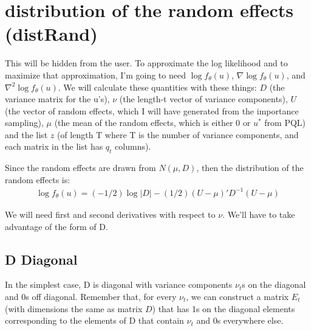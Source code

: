 \documentclass{article}
\begin{document}
\section{distribution of the random effects (distRand)}
This will be hidden from the user.  To  approximate the log likelihood and to maximize that approximation, I'm going to need $\log f_\theta(u)$, $\nabla \log f_\theta(u)$, and $\nabla^2 \log f_\theta(u)$.  We will calculate these quantities with these things: $D$ (the variance matrix for the u's), $\nu$ (the length-t vector of variance components), $U$ (the vector of random effects, which I will have generated from the importance sampling), $\mu$ (the mean of the random effects, which is either 0 or $u^*$ from PQL) and the list $z$ (of length T where T is the number of variance components, and each matrix in the list has $q_t$ columns).


Since the random effects are drawn from $N(\mu, D)$, then the distribution of the random effects is:
\begin{align}
\log f_\theta(u) = (-1/2) \log |D| - (1/2) (U-\mu)' D^{-1} (U-\mu)
\end{align}

We will need first and second derivatives with respect to $\nu$. We'll have to take advantage of the form of D.

\subsection{D Diagonal}
In the simplest case, D is diagonal with variance components $\nu_t$s on the diagonal and 0s off diagonal. Remember that, for every $\nu_t$, we can construct a matrix $E_t$ (with dimensions the same as matrix $D$) that has 1s on the diagonal elements corresponding to the elements of D that contain $\nu_t$ and 0s everywhere else.  
\end{document}

